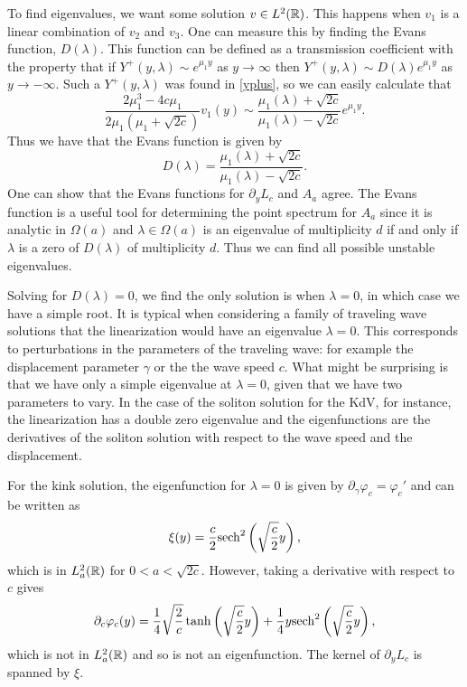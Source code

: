 To find eigenvalues, we want some solution \(v\in L^2(\mathbb{R})\). This happens when \(v_1\) is a linear combination of \(v_2\) and \(v_3\). One can measure this by finding the Evans function, \(D(\lambda)\). This function can be defined as a transmission coefficient with the property that if \(Y^+(y,\lambda)\sim e^{\mu_1 y}\) as \(y\to \infty\) then \(Y^+(y,\lambda) \sim D(\lambda) e^{\mu_1 y}\) as \(y\to-\infty\). Such a \(Y^+(y,\lambda)\) was found in \cref{yplus}, so we can easily calculate that
\begin{equation}
	\frac{2\mu_1^3 - 4c\mu_1}{2\mu_1(\mu_1 + \sqrt{2c})} v_1(y) \sim \frac{\mu_1(\lambda) + \sqrt{2c}}{\mu_1(\lambda) - \sqrt{2c}} e^{\mu_1 y}.
\end{equation}
Thus we have that the Evans function is given by
\begin{equation}
	D(\lambda ) = \frac{\mu_1(\lambda) + \sqrt{2c}}{\mu_1(\lambda) - \sqrt{2c}}.
\end{equation}
One can show that the Evans functions for \(\partial_y L_c\) and \(A_a\) agree. The Evans function is a useful tool for determining the point spectrum for \(A_a\) since it is analytic in \(\Omega(a)\) and \(\lambda \in \Omega(a)\) is an eigenvalue of multiplicity \(d\) if and only if \(\lambda\) is a zero of \(D(\lambda)\) of multiplicity \(d\). Thus we can find all possible unstable eigenvalues.

Solving for \(D(\lambda) = 0\), we find the only solution is when \(\lambda = 0\), in which case we have a simple root. It is typical when considering a family of traveling wave solutions that the linearization would have an eigenvalue \(\lambda = 0\). This corresponds to perturbations in the parameters of the traveling wave: for example the displacement parameter \(\gamma\) or the the wave speed \(c\). What might be surprising is that we have only a simple eigenvalue at \(\lambda = 0\), given that we have two parameters to vary. In the case of the soliton solution for the KdV, for instance, the linearization has a double zero eigenvalue and the eigenfunctions are the derivatives of the soliton solution with respect to the wave speed and the displacement.

For the kink solution, the eigenfunction for \(\lambda = 0\) is given by \(\partial_\gamma \varphi_c = \varphi_c'\) and can be written as 
\begin{equation}
	\xi(y) = \frac c 2 \mathrm{sech}^2\left( \sqrt{\frac c 2} y \right),
\end{equation}
which is in \(L^2_a(\mathbb{R})\) for \(0 < a < \sqrt {2c}\). However, taking a derivative with respect to \(c\) gives
\begin{equation}
	\partial_c \varphi_c (y) =  \frac 1 4 \sqrt{\frac 2 c} \tanh\left(\sqrt{\frac c 2} y\right) + \frac 1 4 y \mathrm{sech}^2\left(\sqrt{\frac c 2} y\right),
\end{equation}
which is not in \(L^2_a(\mathbb{R})\) and so is not an eigenfunction. The kernel of \(\partial_y L_c\) is spanned by \(\xi\). 

